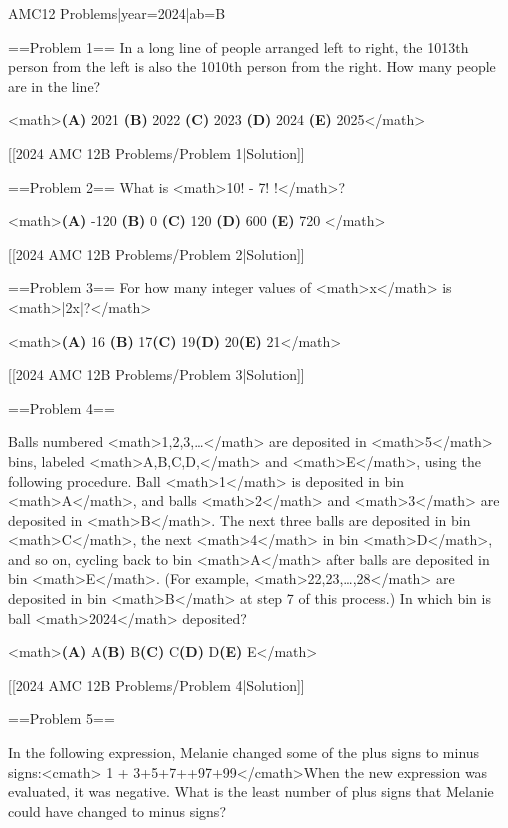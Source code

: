 {{AMC12 Problems|year=2024|ab=B}}

==Problem 1==
In a long line of people arranged left to right, the 1013th person from the left is also the 1010th person from the right. How many people are in the line?

<math>\textbf{(A) } 2021 \qquad\textbf{(B) } 2022 \qquad\textbf{(C) } 2023 \qquad\textbf{(D) } 2024 \qquad\textbf{(E) } 2025</math>

[[2024 AMC 12B Problems/Problem 1|Solution]]

==Problem 2==
What is <math>10! - 7! !</math>?

<math>\textbf{(A) }-120 \qquad\textbf{(B) }0 \qquad\textbf{(C) }120 \qquad\textbf{(D) }600 \qquad\textbf{(E) }720 \qquad</math>

[[2024 AMC 12B Problems/Problem 2|Solution]]

==Problem 3==
For how many integer values of <math>x</math> is <math>|2x|\pi?</math>

<math>\textbf{(A) }16 \qquad\textbf{(B) }17\qquad\textbf{(C) }19\qquad\textbf{(D) }20\qquad\textbf{(E) }21</math>

[[2024 AMC 12B Problems/Problem 3|Solution]]

==Problem 4==

Balls numbered <math>1,2,3,\ldots</math> are deposited in <math>5</math> bins, labeled <math>A,B,C,D,</math> and <math>E</math>, using the following procedure. Ball <math>1</math> is deposited in bin <math>A</math>, and balls <math>2</math> and <math>3</math> are deposited in <math>B</math>. The next three balls are deposited in bin <math>C</math>, the next <math>4</math> in bin <math>D</math>, and so on, cycling back to bin <math>A</math> after balls are deposited in bin <math>E</math>. (For example, <math>22,23,\ldots,28</math> are deposited in bin <math>B</math> at step 7 of this process.) In which bin is ball <math>2024</math> deposited?

<math>\textbf{(A) }A\qquad\textbf{(B) }B\qquad\textbf{(C) }C\qquad\textbf{(D) }D\qquad\textbf{(E) }E</math>

[[2024 AMC 12B Problems/Problem 4|Solution]]

==Problem 5==

In the following expression, Melanie changed some of the plus signs to minus signs:<cmath> 1 + 3+5+7+\cdots+97+99</cmath>When the new expression was evaluated, it was negative. What is the least number of plus signs that Melanie could have changed to minus signs?

